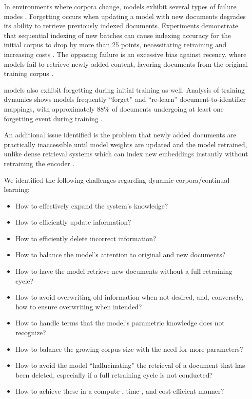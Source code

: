 In environments where corpora change,  models exhibit several types of failure modes \cite{chen-continual-learning,zhen-zhang-replication-and,peiwen-yuan-generative-dense,sanket-vaibhav-mehta-dsi-updating}.
Forgetting occurs when updating a model with new documents degrades its ability to retrieve previously indexed documents. Experiments demonstrate that sequential indexing of new batches can cause indexing accuracy for the initial corpus to drop by more than 25 points, necessitating retraining and increasing costs \cite{sanket-vaibhav-mehta-dsi-updating}. The opposing failure is an excessive bias against recency, where models fail to retrieve newly added content, favoring documents from the original training corpus \cite{zhen-zhang-replication-and}.

 models also exhibit forgetting during initial training as well. Analysis of training dynamics shows models frequently ``forget'' and ``re-learn'' document-to-identifier mappings, with approximately 88\% of documents undergoing at least one forgetting event during training \cite{sanket-vaibhav-mehta-dsi-updating}.

An additional issue identified is the problem that newly added documents are practically inaccessible until model weights are updated and the model retrained, unlike dense retrieval systems which can index new embeddings instantly without retraining the encoder \cite{tzulin-kuo-a-survey}.

We identified the following challenges regarding dynamic corpora/continual learning:
\newenvironment{tightitemize}{
\begin{itemize}\setlength{\itemsep}{0pt}\setlength{\parskip}{0pt}}{\end{itemize}}

\begin{tightitemize}
    \item How to effectively expand the system's knowledge?
    \item How to efficiently update information?
    \item How to efficiently delete incorrect information?
    \item How to balance the model's attention to original and new documents?
    \item How to have the model retrieve new documents without a full retraining cycle?
    \item How to avoid overwriting old information when not desired, and, conversely, how to ensure overwriting when intended?
    \item How to handle terms that the model’s parametric knowledge does not recognize?
    \item How to balance the growing corpus size with the need for more parameters?
    \item How to avoid the model “hallucinating” the retrieval of a document that has been deleted, especially if a full retraining cycle is not conducted?
    \item How to achieve these in a compute-, time-, and cost-efficient manner?
\end{tightitemize}


